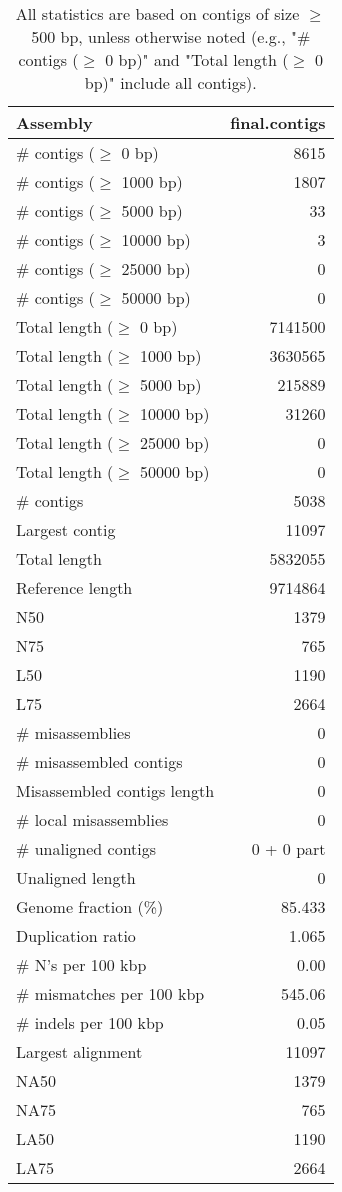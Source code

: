 \documentclass[12pt,a4paper]{article}
\begin{document}
\begin{table}[ht]
\begin{center}
\caption{All statistics are based on contigs of size $\geq$ 500 bp, unless otherwise noted (e.g., "\# contigs ($\geq$ 0 bp)" and "Total length ($\geq$ 0 bp)" include all contigs).}
\begin{tabular}{|l*{1}{|r}|}
\hline
Assembly & final.contigs \\ \hline
\# contigs ($\geq$ 0 bp) & 8615 \\ \hline
\# contigs ($\geq$ 1000 bp) & 1807 \\ \hline
\# contigs ($\geq$ 5000 bp) & 33 \\ \hline
\# contigs ($\geq$ 10000 bp) & 3 \\ \hline
\# contigs ($\geq$ 25000 bp) & 0 \\ \hline
\# contigs ($\geq$ 50000 bp) & 0 \\ \hline
Total length ($\geq$ 0 bp) & 7141500 \\ \hline
Total length ($\geq$ 1000 bp) & 3630565 \\ \hline
Total length ($\geq$ 5000 bp) & 215889 \\ \hline
Total length ($\geq$ 10000 bp) & 31260 \\ \hline
Total length ($\geq$ 25000 bp) & 0 \\ \hline
Total length ($\geq$ 50000 bp) & 0 \\ \hline
\# contigs & 5038 \\ \hline
Largest contig & 11097 \\ \hline
Total length & 5832055 \\ \hline
Reference length & 9714864 \\ \hline
N50 & 1379 \\ \hline
N75 & 765 \\ \hline
L50 & 1190 \\ \hline
L75 & 2664 \\ \hline
\# misassemblies & 0 \\ \hline
\# misassembled contigs & 0 \\ \hline
Misassembled contigs length & 0 \\ \hline
\# local misassemblies & 0 \\ \hline
\# unaligned contigs & 0 + 0 part \\ \hline
Unaligned length & 0 \\ \hline
Genome fraction (\%) & 85.433 \\ \hline
Duplication ratio & 1.065 \\ \hline
\# N's per 100 kbp & 0.00 \\ \hline
\# mismatches per 100 kbp & 545.06 \\ \hline
\# indels per 100 kbp & 0.05 \\ \hline
Largest alignment & 11097 \\ \hline
NA50 & 1379 \\ \hline
NA75 & 765 \\ \hline
LA50 & 1190 \\ \hline
LA75 & 2664 \\ \hline
\end{tabular}
\end{center}
\end{table}
\end{document}
